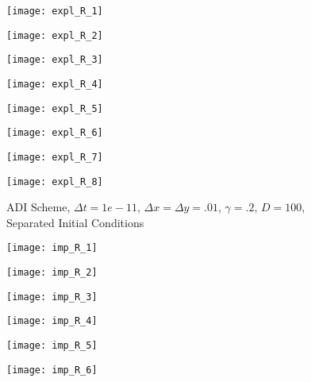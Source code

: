 \documentclass[]{article}
\theoremstyle{definition}
\numberwithin{equation}{section}
\numberwithin{equation}{section}
\begin{document}
\begin{figure}[H]
	\begin{minipage}{0.5\textwidth}
		\hspace*{-2cm}
		\texttt{[image: expl\_R\_1]}
	\end{minipage}
	\begin{minipage}{0.5\textwidth}
		\texttt{[image: expl\_R\_2]}
	\end{minipage}
	\begin{minipage}{0.5\textwidth}
		\hspace*{-2cm}
		\texttt{[image: expl\_R\_3]}
	\end{minipage}
	\begin{minipage}{0.5\textwidth}
		\texttt{[image: expl\_R\_4]}
	\end{minipage}	
	\begin{minipage}{0.5\textwidth}
		\hspace*{-2cm}
		\texttt{[image: expl\_R\_5]}
	\end{minipage}
	\begin{minipage}{0.5\textwidth}
		\texttt{[image: expl\_R\_6]}
	\end{minipage}
\end{figure}
\begin{figure}[H]
	\begin{minipage}{0.5\textwidth}
		\hspace*{-2cm}
		\texttt{[image: expl\_R\_7]}
	\end{minipage}
	\begin{minipage}{0.5\textwidth}
		\texttt{[image: expl\_R\_8]}
	\end{minipage}
	\caption{ADI Scheme, $\Delta t = 1e-11$, $\Delta x = \Delta y = .01$, $\gamma = .2$, $D = 100$, Separated Initial Conditions }
\end{figure}
\begin{figure}[H]
	\begin{minipage}{0.5\textwidth}
		\hspace*{-2cm}
		\texttt{[image: imp\_R\_1]}
	\end{minipage}
	\begin{minipage}{0.5\textwidth}
		\texttt{[image: imp\_R\_2]}
	\end{minipage}
	\begin{minipage}{0.5\textwidth}
		\hspace*{-2cm}
		\texttt{[image: imp\_R\_3]}
	\end{minipage}
	\begin{minipage}{0.5\textwidth}
		\texttt{[image: imp\_R\_4]}
	\end{minipage}	
	\begin{minipage}{0.5\textwidth}
		\hspace*{-2cm}
		\texttt{[image: imp\_R\_5]}
	\end{minipage}
	\begin{minipage}{0.5\textwidth}
		\texttt{[image: imp\_R\_6]}
	\end{minipage}
\end{figure}
\end{document}
